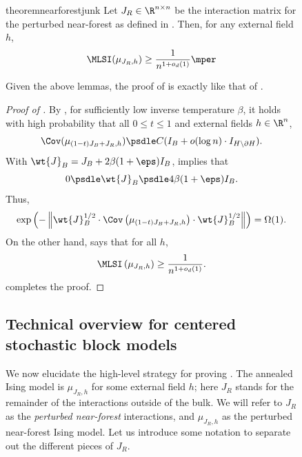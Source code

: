 \documentclass[11pt,letterpaper]{article}
\begin{document}
\begin{figure}
\begin{restatable}{theorem}{nearforestjunk}
    \label{thm:near-forest-junk-mlsi}
    Let $J_R \in \R^{n \times n}$ be the interaction matrix for the perturbed near-forest as defined in . Then, for any external field $h$,
    \[
        \MLSI(\mu_{J_R, h}) \ge \frac{1}{n^{1+o_d(1)}}\mper
    \]
\end{restatable}


Given the above lemmas, the proof of  is exactly like that of .

\begin{proof}[Proof of ]
    By , for sufficiently low inverse temperature $\beta$, it holds with high probability that all $0 \le t \le 1$ and external fields $h \in \R^n$,
    \[ \Cov(\mu_{(1-t)J_B+ J_R,h}) \psdle C(I_B + o(\log n) \cdot I_{H \setminus \partial H}). \]
    With $\wt{J}_B = J_B + 2\beta(1+\eps) I_B$,
     implies that 
    \[ 0 \psdle \wt{J}_B \psdle 4\beta(1+\eps) I_B. \]
    Thus,
    \[ \exp \left( - \left\| \wt{J}_B^{1/2} \cdot \Cov\left( \mu_{(1-t)J_B + J_R, h} \right) \cdot \wt{J}_B^{1/2} \right\| \right) = \Omega(1). \]
    On the other hand,  says that for all $h$,
    \[ \MLSI\left( \mu_{J_R,h} \right) \ge \frac{1}{n^{1+o_d(1)}}. \]
     completes the proof.
\end{proof}

\subsection{Technical overview for centered stochastic block models}

We now elucidate the high-level strategy for proving . 
The annealed Ising model is $\mu_{J_R, h}$ for some external field $h$; here $J_R$ stands for the remainder of the interactions outside of the bulk. 
We will refer to $J_R$ as the \emph{perturbed near-forest} interactions, and $\mu_{J_R, h}$ as the perturbed near-forest Ising model.
Let us introduce some notation to separate out the different pieces of $J_R$. 


\end{figure}
\end{document}
